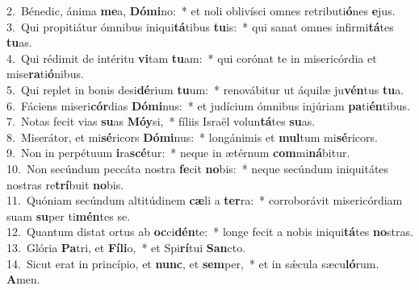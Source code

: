 {2.~}Bénedic, ánima \textbf{me}a, \textbf{Dó}\textbf{mi}no:~* et noli oblivísci omnes retributi\textbf{ó}nes \textbf{e}jus.\\
{3.~}Qui propitiátur ómnibus iniqui\textbf{tá}tibus \textbf{tu}is:~* qui sanat omnes infirmi\textbf{tá}tes \textbf{tu}as.\\
{4.~}Qui rédimit de intéritu \textbf{vi}tam \textbf{tu}am:~* qui corónat te in misericórdia et mise\textbf{ra}ti\textbf{ó}nibus.\\
{5.~}Qui replet in bonis desi\textbf{dé}rium \textbf{tu}um:~* renovábitur ut áquilæ ju\textbf{vén}tus \textbf{tu}a.\\
{6.~}Fáciens miseri\textbf{cór}dias \textbf{Dó}\textbf{mi}nus:~* et judícium ómnibus injúriam \textbf{pa}ti\textbf{én}tibus.\\
{7.~}Notas fecit vias \textbf{su}as \textbf{Mó}\textbf{y}si,~* fíliis Israël volun\textbf{tá}tes \textbf{su}as.\\
{8.~}Miserátor, et mi\textbf{sé}ricors \textbf{Dó}\textbf{mi}nus:~* longánimis et \textbf{mul}tum mi\textbf{sé}ricors.\\
{9.~}Non in perpétuum \textbf{i}ra\textbf{scé}tur:~* neque in ætérnum \textbf{com}mi\textbf{ná}bitur.\\
{10.~}Non secúndum peccáta nostra \textbf{fe}cit \textbf{no}bis:~* neque secúndum iniquitátes nostras re\textbf{trí}buit \textbf{no}bis.\\
{11.~}Quóniam secúndum altitúdinem \textbf{cæ}li a \textbf{ter}ra:~* corroborávit misericórdiam suam \textbf{su}per ti\textbf{mén}tes se.\\
{12.~}Quantum distat ortus ab \textbf{oc}ci\textbf{dén}te:~* longe fecit a nobis iniqui\textbf{tá}tes \textbf{no}stras.\\
{13.~}Glória \textbf{Pa}tri, et \textbf{Fí}\textbf{li}o,~* et Spi\textbf{rí}tui \textbf{San}cto.\\
{14.~}Sicut erat in princípio, et \textbf{nunc}, et \textbf{sem}per,~* et in sǽcula sæcu\textbf{ló}rum. \textbf{A}men.\\
